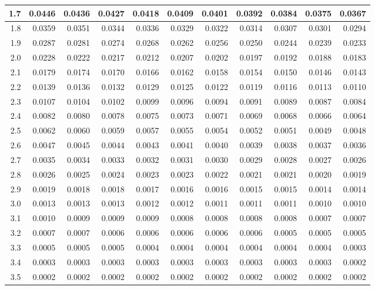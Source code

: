 \documentclass[
]{book}
\begin{document}
\begin{tabular}{r|r|r|r|r|r|r|r|r|r|r}
\hline
1.7 & 0.0446 & 0.0436 & 0.0427 & 0.0418 & 0.0409 & 0.0401 & 0.0392 & 0.0384 & 0.0375 & 0.0367\\
\hline
1.8 & 0.0359 & 0.0351 & 0.0344 & 0.0336 & 0.0329 & 0.0322 & 0.0314 & 0.0307 & 0.0301 & 0.0294\\
\hline
1.9 & 0.0287 & 0.0281 & 0.0274 & 0.0268 & 0.0262 & 0.0256 & 0.0250 & 0.0244 & 0.0239 & 0.0233\\
\hline
2.0 & 0.0228 & 0.0222 & 0.0217 & 0.0212 & 0.0207 & 0.0202 & 0.0197 & 0.0192 & 0.0188 & 0.0183\\
\hline
2.1 & 0.0179 & 0.0174 & 0.0170 & 0.0166 & 0.0162 & 0.0158 & 0.0154 & 0.0150 & 0.0146 & 0.0143\\
\hline
2.2 & 0.0139 & 0.0136 & 0.0132 & 0.0129 & 0.0125 & 0.0122 & 0.0119 & 0.0116 & 0.0113 & 0.0110\\
\hline
2.3 & 0.0107 & 0.0104 & 0.0102 & 0.0099 & 0.0096 & 0.0094 & 0.0091 & 0.0089 & 0.0087 & 0.0084\\
\hline
2.4 & 0.0082 & 0.0080 & 0.0078 & 0.0075 & 0.0073 & 0.0071 & 0.0069 & 0.0068 & 0.0066 & 0.0064\\
\hline
2.5 & 0.0062 & 0.0060 & 0.0059 & 0.0057 & 0.0055 & 0.0054 & 0.0052 & 0.0051 & 0.0049 & 0.0048\\
\hline
2.6 & 0.0047 & 0.0045 & 0.0044 & 0.0043 & 0.0041 & 0.0040 & 0.0039 & 0.0038 & 0.0037 & 0.0036\\
\hline
2.7 & 0.0035 & 0.0034 & 0.0033 & 0.0032 & 0.0031 & 0.0030 & 0.0029 & 0.0028 & 0.0027 & 0.0026\\
\hline
2.8 & 0.0026 & 0.0025 & 0.0024 & 0.0023 & 0.0023 & 0.0022 & 0.0021 & 0.0021 & 0.0020 & 0.0019\\
\hline
2.9 & 0.0019 & 0.0018 & 0.0018 & 0.0017 & 0.0016 & 0.0016 & 0.0015 & 0.0015 & 0.0014 & 0.0014\\
\hline
3.0 & 0.0013 & 0.0013 & 0.0013 & 0.0012 & 0.0012 & 0.0011 & 0.0011 & 0.0011 & 0.0010 & 0.0010\\
\hline
3.1 & 0.0010 & 0.0009 & 0.0009 & 0.0009 & 0.0008 & 0.0008 & 0.0008 & 0.0008 & 0.0007 & 0.0007\\
\hline
3.2 & 0.0007 & 0.0007 & 0.0006 & 0.0006 & 0.0006 & 0.0006 & 0.0006 & 0.0005 & 0.0005 & 0.0005\\
\hline
3.3 & 0.0005 & 0.0005 & 0.0005 & 0.0004 & 0.0004 & 0.0004 & 0.0004 & 0.0004 & 0.0004 & 0.0003\\
\hline
3.4 & 0.0003 & 0.0003 & 0.0003 & 0.0003 & 0.0003 & 0.0003 & 0.0003 & 0.0003 & 0.0003 & 0.0002\\
\hline
3.5 & 0.0002 & 0.0002 & 0.0002 & 0.0002 & 0.0002 & 0.0002 & 0.0002 & 0.0002 & 0.0002 & 0.0002\\

\end{tabular}
\end{document}
